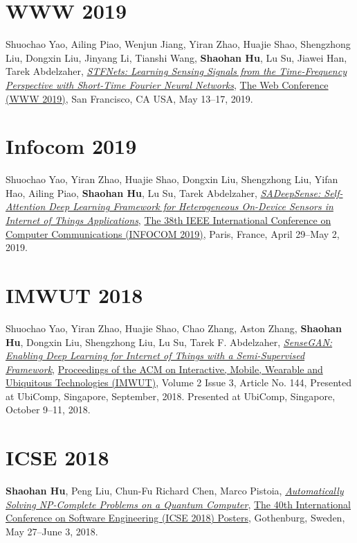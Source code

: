 \section{\sc WWW 2019}\hypertarget{yao2019www}{}
Shuochao Yao, Ailing Piao, Wenjun Jiang, Yiran Zhao, Huajie Shao, Shengzhong Liu, Dongxin Liu, Jinyang Li, Tianshi Wang, \textbf{Shaohan Hu}, Lu Su, Jiawei Han, Tarek Abdelzaher,
\href{}{\emph{STFNets: Learning Sensing Signals from the Time-Frequency Perspective with Short-Time Fourier Neural Networks}},
\href{https://www2019.thewebconf.org/}{\textsf{The Web Conference (WWW 2019)}},
San Francisco, CA USA, May 13--17, 2019.

\section{\sc Infocom 2019}\hypertarget{yao2019infocom}{}
Shuochao Yao, Yiran Zhao, Huajie Shao, Dongxin Liu, Shengzhong Liu, Yifan Hao, Ailing Piao, \textbf{Shaohan Hu}, Lu Su, Tarek Abdelzaher,
\href{}{\emph{SADeepSense: Self-Attention Deep Learning Framework for Heterogeneous On-Device Sensors in Internet of Things Applications}},
\href{https://infocom2019.ieee-infocom.org/}{\textsf{The 38th IEEE International Conference on Computer Communications (INFOCOM 2019)}},
Paris, France, April 29--May 2, 2019.

\section{\sc IMWUT 2018}\hypertarget{yao2018imwut}{}
Shuochao Yao, Yiran Zhao, Huajie Shao, Chao Zhang, Aston Zhang, \textbf{Shaohan Hu}, Dongxin Liu, Shengzhong Liu, Lu Su, Tarek F. Abdelzaher,
\href{https://dl.acm.org/citation.cfm?id=3264954}{\emph{SenseGAN: Enabling Deep Learning for Internet of Things with a Semi-Supervised Framework}},
\href{https://imwut.acm.org/}{\textsf{Proceedings of the ACM on Interactive, Mobile, Wearable and Ubiquitous Technologies (IMWUT)}},
Volume 2 Issue 3, Article No. 144, Presented at UbiComp, Singapore, September, 2018.
Presented at UbiComp, Singapore, October 9--11, 2018.

\section{\sc ICSE 2018}\hypertarget{hu2018icse}{}
\textbf{Shaohan Hu}, Peng Liu, Chun-Fu Richard Chen, Marco Pistoia,
\href{https://dl.acm.org/citation.cfm?id=3194959}{\emph{Automatically Solving NP-Complete Problems on a Quantum Computer}},
\href{https://www.icse2018.org/track/icse-2018-Posters}{\textsf{The 40th International Conference on Software Engineering (ICSE 2018) Posters}},
Gothenburg, Sweden, May 27--June 3, 2018.

